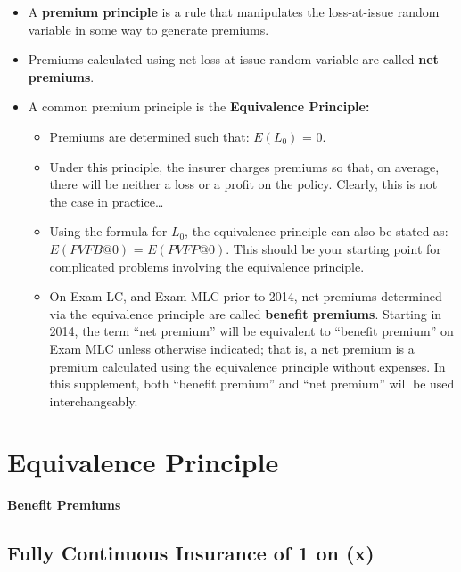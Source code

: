 \documentclass[]{book}
\begin{document}
\begin{itemize}
\item
  A \textbf{premium principle} is a rule that manipulates the
  loss-at-issue random variable in some way to generate premiums.
\item
  Premiums calculated using net loss-at-issue random variable are called
  \textbf{net premiums}.
\item
  A common premium principle is the \textbf{Equivalence Principle:}

  \begin{itemize}
  \item
    Premiums are determined such that: \(E(L_0)\) = 0.
  \item
    Under this principle, the insurer charges premiums so that, on
    average, there will be neither a loss or a profit on the policy.
    Clearly, this is not the case in practice\ldots{}
  \item
    Using the formula for \(L_0\), the equivalence principle can also be
    stated as: \(E(PVFB@0)\) = \(E(PVFP@0)\). This should be your
    starting point for complicated problems involving the equivalence
    principle.
  \item
    On Exam LC, and Exam MLC prior to 2014, net premiums determined via
    the equivalence principle are called \textbf{benefit premiums}.
    Starting in 2014, the term ``net premium'' will be equivalent to
    ``benefit premium'' on Exam MLC unless otherwise indicated; that is,
    a net premium is a premium calculated using the equivalence
    principle without expenses. In this supplement, both ``benefit
    premium'' and ``net premium'' will be used interchangeably.
  \end{itemize}
\end{itemize}

\section{Equivalence Principle}\label{equivalence-principle}

\textbf{Benefit Premiums}

\subsection{Fully Continuous Insurance of 1 on
(x)}\label{fully-continuous-insurance-of-1-on-x}
\end{document}
